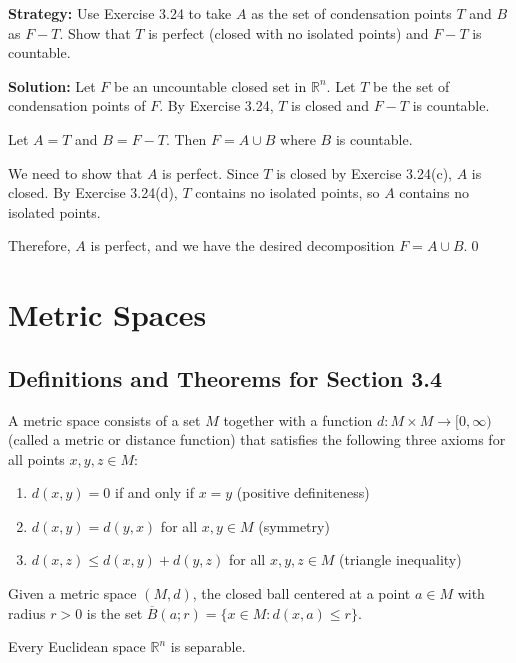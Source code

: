 \noindent\textbf{Strategy:} Use Exercise 3.24 to take $A$ as the set of condensation points $T$ and $B$ as $F-T$. Show that $T$ is perfect (closed with no isolated points) and $F-T$ is countable.

\bigskip\noindent\textbf{Solution:} Let $F$ be an uncountable closed set in $\mathbb{R}^n$. Let $T$ be the set of condensation points of $F$. By Exercise 3.24, $T$ is closed and $F - T$ is countable.

Let $A = T$ and $B = F - T$. Then $F = A \cup B$ where $B$ is countable.

We need to show that $A$ is perfect. Since $T$ is closed by Exercise 3.24(c), $A$ is closed. By Exercise 3.24(d), $T$ contains no isolated points, so $A$ contains no isolated points.

Therefore, $A$ is perfect, and we have the desired decomposition $F = A \cup B$.\qed
\section{Metric Spaces}

\subsection*{Definitions and Theorems for Section 3.4}

\begin{definition}
A metric space consists of a set $M$ together with a function $d: M \times M \to [0,\infty)$ (called a metric or distance function) that satisfies the following three axioms for all points $x, y, z \in M$:
\begin{enumerate}
\item $d(x,y) = 0$ if and only if $x = y$ (positive definiteness)
\item $d(x,y) = d(y,x)$ for all $x,y \in M$ (symmetry)
\item $d(x,z) \leq d(x,y) + d(y,z)$ for all $x,y,z \in M$ (triangle inequality)
\end{enumerate}
\end{definition}

\begin{definition}
Given a metric space $(M,d)$, the closed ball centered at a point $a \in M$ with radius $r > 0$ is the set $\overline{B}(a;r) = \{x \in M : d(x,a) \leq r\}$.
\end{definition}

\begin{theorem}
Every Euclidean space $\mathbb{R}^n$ is separable.
\end{theorem}

